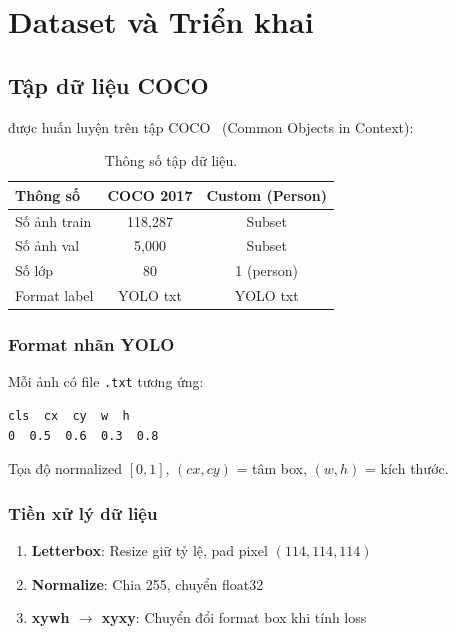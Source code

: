 \chapter{Dataset và Triển khai}
\label{ch:dataset_deployment}

\section{Tập dữ liệu COCO}

\yolo được huấn luyện trên tập COCO~\cite{coco} (Common Objects in Context):

\begin{table}[H]
\centering
\begin{tabular}{lcc}
\toprule
\textbf{Thông số} & \textbf{COCO 2017} & \textbf{Custom (Person)} \\
\midrule
Số ảnh train & 118,287 & Subset \\
Số ảnh val & 5,000 & Subset \\
Số lớp & 80 & 1 (person) \\
Format label & YOLO txt & YOLO txt \\
\bottomrule
\end{tabular}
\caption{Thông số tập dữ liệu.}
\end{table}

\subsection{Format nhãn YOLO}

Mỗi ảnh có file \texttt{.txt} tương ứng:
\begin{verbatim}
cls  cx  cy  w  h
0  0.5  0.6  0.3  0.8
\end{verbatim}
Tọa độ normalized $[0, 1]$, $(cx, cy)$ = tâm box, $(w, h)$ = kích thước.

\subsection{Tiền xử lý dữ liệu}

\begin{enumerate}
    \item \textbf{Letterbox}: Resize giữ tỷ lệ, pad pixel $(114, 114, 114)$
    \item \textbf{Normalize}: Chia 255, chuyển float32
    \item \textbf{xywh $\to$ xyxy}: Chuyển đổi format box khi tính loss
\end{enumerate}

